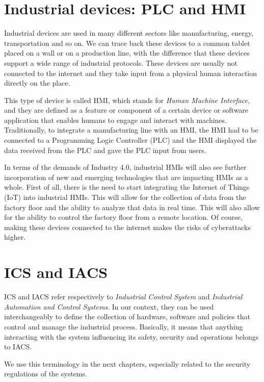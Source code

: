 \section{Industrial devices: PLC and HMI}

Industrial devices are used in many different sectors like manufacturing, energy, transportation and so on. We can trace back these devices to a common tablet placed on a wall or on a production line, with the difference that these devices support a wide range of industrial protocols. These devices are usually not connected to the internet and they take input from a physical human interaction directly on the place.

This type of device is called HMI, which stands for \textit{Human Machine Interface}, and they are defined as a feature or component of a certain device or software application that enables humans to engage and interact with machines.\\
Traditionally, to integrate a manufacturing line with an HMI, the HMI had to be connected to a Programming Logic Controller (PLC) and the HMI displayed the data received from the PLC and gave the PLC input from users.~\cite{what-is-hmi}

In terms of the demands of Industry 4.0, industrial HMIs will also see further incorporation of new and emerging technologies that are impacting HMIs as a whole. First of all, there is the need to start integrating the Internet of Things (IoT) into industrial HMIs. This will allow for the collection of data from the factory floor and the ability to analyze that data in real time. This will also allow for the ability to control the factory floor from a remote location. Of course, making these devices connected to the internet makes the risks of cyberattacks higher.

\section{ICS and IACS}

ICS and IACS refer respectively to \textit{Industrial Control System} and \textit{Industrial Automation and Control Systems}. In our context, they can be used interchangeably to define the collection of hardware, software and policies that control and manage the industrial process. Basically, it means that anything interacting with the system influencing its safety, security and operations belongs to IACS.~\cite{ics-or-iacs}

We use this terminology in the next chapters, especially related to the security regulations of the systems.

